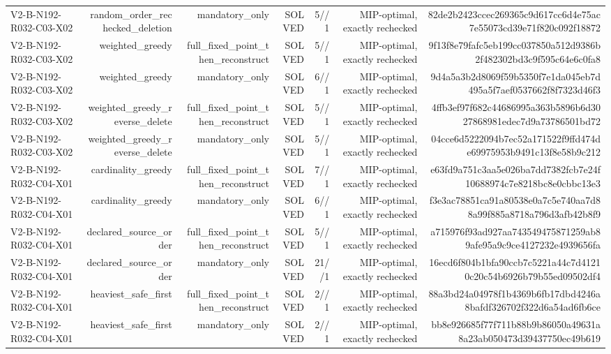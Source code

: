 {\begin{longtable}{lrrrrrr}
V2-B-N192-R032-C03-X02 & random\_order\_rechecked\_deletion & mandatory\_only & SOLVED & 5//1 & MIP-optimal, exactly rechecked & 82de2b2423ccec269365c9d617cc6d4e75ac7e55073cd39e71f820c092f18872 \\
V2-B-N192-R032-C03-X02 & weighted\_greedy & full\_fixed\_point\_then\_reconstruct & SOLVED & 5//1 & MIP-optimal, exactly rechecked & 9f13f8e79fafc5eb199cc037850a512d9386b2f482302bd3c9f595c64e6c0fa8 \\
V2-B-N192-R032-C03-X02 & weighted\_greedy & mandatory\_only & SOLVED & 6//1 & MIP-optimal, exactly rechecked & 9d4a5a3b2d8069f59b5350f7e1da045eb7d495a5f7aef0537662f8f7323d46f3 \\
V2-B-N192-R032-C03-X02 & weighted\_greedy\_reverse\_delete & full\_fixed\_point\_then\_reconstruct & SOLVED & 5//1 & MIP-optimal, exactly rechecked & 4ffb3ef97f682c44686995a363b5896b6d3027868981edec7d9a73786501bd72 \\
V2-B-N192-R032-C03-X02 & weighted\_greedy\_reverse\_delete & mandatory\_only & SOLVED & 5//1 & MIP-optimal, exactly rechecked & 04cce6d5222094b7ec52a171522f9ffd474de69975953b9491c13f8e58b9c212 \\
V2-B-N192-R032-C04-X01 & cardinality\_greedy & full\_fixed\_point\_then\_reconstruct & SOLVED & 7//1 & MIP-optimal, exactly rechecked & e63fd9a751c3aa5e026ba7dd7382fcb7e24f10688974c7e8218bc8e0cbbc13e3 \\
V2-B-N192-R032-C04-X01 & cardinality\_greedy & mandatory\_only & SOLVED & 6//1 & MIP-optimal, exactly rechecked & f3e3ac78851ca91a80538e0a7c5e740aa7d88a99f885a8718a796d3afb42b8f9 \\
V2-B-N192-R032-C04-X01 & declared\_source\_order & full\_fixed\_point\_then\_reconstruct & SOLVED & 5//1 & MIP-optimal, exactly rechecked & a715976f93ad927aa743549475871259ab89afe95a9c9ce4127232e4939656fa \\
V2-B-N192-R032-C04-X01 & declared\_source\_order & mandatory\_only & SOLVED & 21//1 & MIP-optimal, exactly rechecked & 16ecd6f804b1bfa90ccb7c5221a44c7d41210c20c54b6926b79b55ed09502df4 \\
V2-B-N192-R032-C04-X01 & heaviest\_safe\_first & full\_fixed\_point\_then\_reconstruct & SOLVED & 2//1 & MIP-optimal, exactly rechecked & 88a3bd24a04978f1b4369b6fb17dbd4246a8bafdf326702f322d6a54ad6fb6ce \\
V2-B-N192-R032-C04-X01 & heaviest\_safe\_first & mandatory\_only & SOLVED & 2//1 & MIP-optimal, exactly rechecked & bb8e926685f77f711b88b9b86050a49631a8a23ab050473d39437750ec49b619 \\

\end{longtable}}
